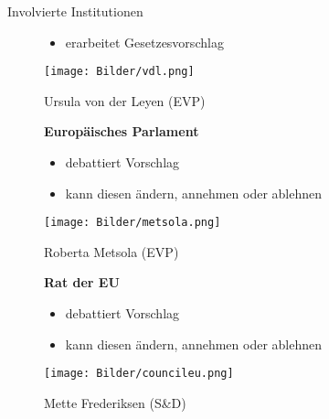 \documentclass{beamer}
\begin{document}
\begin{frame}{Involvierte Institutionen}
\begin{figure}[!htb]
\begin{minipage}[t]{0.32\textwidth}
\begin{center}
        \begin{itemize}
            \item {\scriptsize erarbeitet Gesetzesvorschlag}
        \end{itemize} 
        \vspace{1.1cm}
        \texttt{[image: Bilder/vdl.png]}
        \caption*{\tiny Ursula von der Leyen (EVP)}
        \end{center}
    \end{minipage}\hfill
    \begin{minipage}[t]{0.32\textwidth}
        \begin{center}
        \vspace{-0.75cm}
        {\footnotesize \textbf{Europäisches Parlament}}
        \newline
        \begin{itemize}
            \item {\scriptsize debattiert Vorschlag}
            \item {\scriptsize kann diesen ändern, annehmen oder ablehnen}
        \end{itemize}
        \vspace{0.1cm}
        \texttt{[image: Bilder/metsola.png]}
        \caption*{\tiny Roberta Metsola (EVP)}
        \end{center}
    \end{minipage}\hfill
    \begin{minipage}[t]{0.32\textwidth}
        \begin{center}
        \vspace{-0.75cm}
        {\footnotesize \textbf{Rat der EU}}
        \newline
        \begin{itemize}
            \item {\scriptsize debattiert Vorschlag}
            \item {\scriptsize kann diesen ändern, annehmen oder ablehnen}
        \end{itemize}
        \vspace{0.1cm}
        \texttt{[image: Bilder/councileu.png]}
        \caption*{\tiny Mette Frederiksen (S\&D)}
        \end{center}
    \end{minipage}
    \end{figure}
\end{frame}
\end{document}
